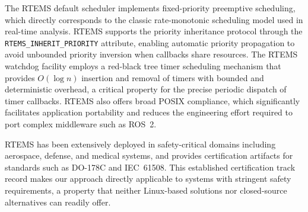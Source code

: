 The RTEMS default scheduler implements fixed-priority preemptive scheduling, which directly corresponds to the classic rate-monotonic scheduling model used in real-time analysis. RTEMS supports the priority inheritance protocol through the \texttt{RTEMS\_INHERIT\_PRIORITY} attribute, enabling automatic priority propagation to avoid unbounded priority inversion when callbacks share resources. The RTEMS watchdog facility employs a red-black tree timer scheduling mechanism that provides $O(\log n)$ insertion and removal of timers with bounded and deterministic overhead, a critical property for the precise periodic dispatch of timer callbacks. RTEMS also offers broad POSIX compliance, which significantly facilitates application portability and reduces the engineering effort required to port complex middleware such as ROS~2.

RTEMS has been extensively deployed in safety-critical domains including aerospace, defense, and medical systems, and provides certification artifacts for standards such as DO-178C and IEC~61508. This established certification track record makes our approach directly applicable to systems with stringent safety requirements, a property that neither Linux-based solutions nor closed-source alternatives can readily offer.
